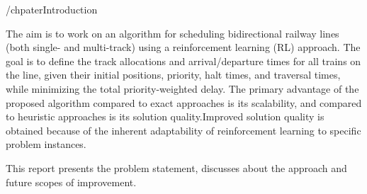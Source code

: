
/chpater{Introduction}
\hspace{3mm}

The aim is to work on an algorithm for scheduling
bidirectional railway lines (both single- and multi-track) using a
reinforcement learning (RL) approach. The goal is to define the
track allocations and arrival/departure times for all trains on the
line, given their initial positions, priority, halt times, and traversal
times, while minimizing the total priority-weighted delay. The
primary advantage of the proposed algorithm compared to
exact approaches is its scalability, and compared to heuristic
approaches is its solution quality.Improved solution quality is obtained because
of the inherent adaptability of reinforcement learning to specific
problem instances.

This report presents the problem statement, discusses about the approach 
and future scopes of improvement.







